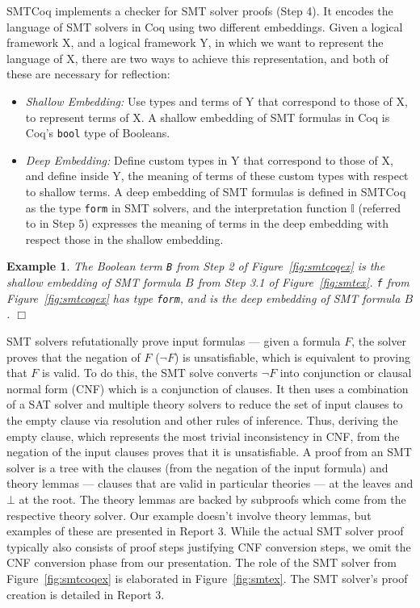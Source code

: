 \documentclass[11pt]{article}
\newtheorem{example}{Example}[section]
\begin{document}
	SMTCoq implements a checker for 
	SMT solver proofs (Step 4). It 
	encodes the language of SMT solvers
	in Coq using two different embeddings. 
	Given a logical framework X, and 
	a logical framework Y, in which we 
	want to represent the language of X, 
	there are two ways to achieve this
	representation, and 
	both of these are necessary for 
	reflection:
	\begin{itemize}
		\item \textit{Shallow Embedding: }
		Use types and terms of Y that 
		correspond to those of X, to 
		represent terms of X. A shallow
		embedding of SMT formulas in 
		Coq is Coq's \texttt{bool} 
		type of Booleans. 
		\item\textit{Deep Embedding: }
		Define custom types in Y that 
		correspond to those of X, and 
		define inside Y, the meaning of 
		terms of these custom types with 
		respect to shallow terms. A 
		deep embedding of SMT formulas 
		is defined in SMTCoq as the type 
		\texttt{form} in SMT solvers, 
		and the interpretation function 
		$\mathbb{I}$ (referred to in 
		Step 5) expresses the meaning 
		of terms in the deep embedding 
		with respect those in the shallow 
		embedding.
	\end{itemize}
	
	\begin{example} 
		\em The Boolean 
		term \texttt{B} from Step 2 of 
		Figure~\ref{fig:smtcoqex}
		is the shallow embedding of SMT 
		formula $B$ from Step 3.1 of 
		Figure~\ref{fig:smtex}.
		\texttt{f} from 
		Figure~\ref{fig:smtcoqex} has
		type \texttt{form}, and is 
		the deep embedding of 
		SMT formula $B$. \hfill $\Box$
	\end{example}

	SMT solvers refutationally prove 
	input formulas --- given a formula
	$F$, the solver proves that the 
	negation of $F$ ($\neg F$) is 
	unsatisfiable, which is equivalent
	to proving that $F$ is valid. 
	To do this, the SMT solve converts 
	$\neg F$ into conjunction or clausal 
	normal form (CNF) which is a 
	conjunction of clauses. It then uses 
	a combination of a SAT solver and 
	multiple theory	solvers to reduce 
	the set of input clauses to the 
	empty clause via resolution
	and other rules of inference. Thus,
	deriving the empty clause, which 
	represents the most trivial
	inconsistency in CNF, from the 
	negation of the input clauses proves 
	that it is unsatisfiable. A proof
	from an SMT solver is a tree 
	with the clauses (from the 
	negation of the input formula) and 
	theory lemmas --- clauses that are 
	valid in particular theories --- at
	the leaves and $\bot$
	at the root. The theory lemmas are 
	backed by subproofs which come from 
	the respective theory solver. Our 
	example doesn't involve theory 
	lemmas, but examples of these 
	are presented in Report 3. While 
	the actual SMT 
	solver proof typically also consists 
	of proof steps justifying CNF 
	conversion steps, we omit the 
	CNF conversion phase from our 
	presentation. The role of the SMT
	solver from Figure~\ref{fig:smtcoqex}
	is elaborated in Figure~\ref{fig:smtex}.
	The SMT solver's proof creation is 
	detailed in Report 3.
	
\end{document}
